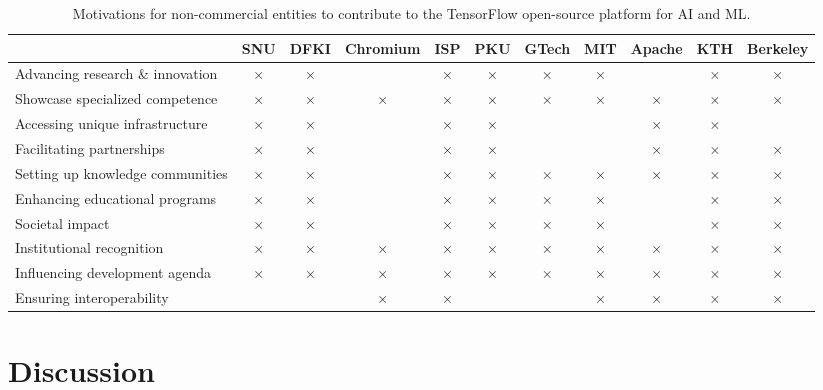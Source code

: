 \documentclass[CHICAGO,Times1COL]{WileyNJDv5} %
\begin{document}
\begin{table}[h]
 
\caption{Motivations for non-commercial entities to contribute to the TensorFlow open-source platform for AI and ML. \label{tmotivations}}

\begin{tabularx}{\textwidth}[]{lcccccccccc}
\toprule
& SNU & DFKI & Chromium & ISP & PKU & GTech & MIT & Apache & KTH & Berkeley\\
\midrule
Advancing research \& innovation & × &  × &  & × & × & × & × &  & × & × \\
Showcase specialized competence & × & × & × & × & × & × & × & × & ×  & ×\\
Accessing unique infrastructure & × & × &  & × & × &  &  & × &  × &  \\
Facilitating partnerships & × & × &  & × & × &  &  & × & ×  & × \\
Setting up knowledge communities & × & × &  & × & × & ×  & × & × & × & × \\
Enhancing educational programs & × &  × &  & × & × & × & × &  & × & × \\
Societal impact & × &  × &  & × & × & × & × &  & × & × \\
Institutional recognition & × & × & × & × & × & × & × & × & ×  & ×\\
Influencing development agenda & × & × & × &×  & × & × & × & × & ×  & ×\\
Ensuring interoperability &  &  & × & × &  &  & × & × &  × & × \\
\bottomrule
\end{tabularx}
\end{table}


\section{Discussion}
\end{document}
